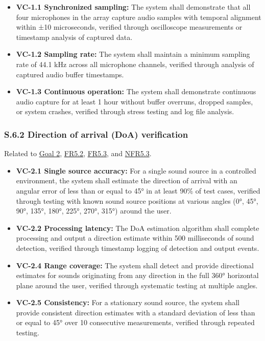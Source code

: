 \documentclass[12pt]{article}
\theoremstyle{definition}
\begin{document}
\begin{itemize}
\item \textbf{VC-1.1 Synchronized sampling:} The system shall demonstrate that
all four microphones in the array capture audio samples with temporal alignment
within ±10 microseconds, verified through oscilloscope measurements or timestamp
analysis of captured data.

\item \textbf{VC-1.2 Sampling rate:} The system shall maintain a minimum
sampling rate of 44.1 kHz across all microphone channels, verified through
analysis of captured audio buffer timestamps.

\item \textbf{VC-1.3 Continuous operation:} The system shall demonstrate
continuous audio capture for at least 1 hour without buffer overruns, dropped
samples, or system crashes, verified through stress testing and log file
analysis.
\end{itemize}

\subsubsection{S.6.2 Direction of arrival (DoA) verification}

Related to \hyperref[goal:audio_direction_analysis]{Goal 2},
\hyperref[FR5_2]{FR5.2}, \hyperref[FR5_3]{FR5.3}, and \hyperref[NFR5_3]{NFR5.3}.

\begin{itemize}
\item \textbf{VC-2.1 Single source accuracy:} For a single sound source in a
controlled environment, the system shall estimate the direction of arrival with
an angular error of less than or equal to 45° in at least 90\% of test cases,
verified through testing with known sound source positions at various angles
(0°, 45°, 90°, 135°, 180°, 225°, 270°, 315°) around the user.

\item \textbf{VC-2.2 Processing latency:} The DoA estimation algorithm shall
complete processing and output a direction estimate within 500 milliseconds of
sound detection, verified through timestamp logging of detection and output
events.

\item \textbf{VC-2.4 Range coverage:} The system shall detect and provide
directional estimates for sounds originating from any direction in the full 360°
horizontal plane around the user, verified through systematic testing at
multiple angles.

\item \textbf{VC-2.5 Consistency:} For a stationary sound source, the system
shall provide consistent direction estimates with a standard deviation of less
than or equal to 45° over 10 consecutive measurements, verified through repeated
testing.
\end{itemize}
\end{document}
